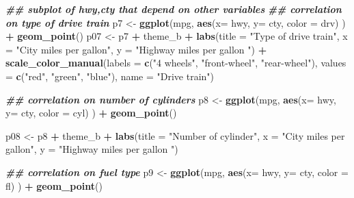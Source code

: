 \documentclass[
]{article}
\newenvironment{Shaded}{\begin{snugshade}}{\end{snugshade}}
\newcommand{\AttributeTok}[1]{\textcolor[rgb]{0.13,0.29,0.53}{#1}}
\newcommand{\DocumentationTok}[1]{\textcolor[rgb]{0.56,0.35,0.01}{\textbf{\textit{#1}}}}
\newcommand{\FunctionTok}[1]{\textcolor[rgb]{0.13,0.29,0.53}{\textbf{#1}}}
\newcommand{\NormalTok}[1]{#1}
\newcommand{\OtherTok}[1]{\textcolor[rgb]{0.56,0.35,0.01}{#1}}
\newcommand{\SpecialCharTok}[1]{\textcolor[rgb]{0.81,0.36,0.00}{\textbf{#1}}}
\newcommand{\StringTok}[1]{\textcolor[rgb]{0.31,0.60,0.02}{#1}}
\begin{document}
\begin{Shaded}
\begin{Highlighting}[]
\DocumentationTok{\#\# subplot of hwy,cty that depend on other variables}
\DocumentationTok{\#\# correlation on type of drive train}
\NormalTok{p7 }\OtherTok{\textless{}{-}} \FunctionTok{ggplot}\NormalTok{(mpg, }\FunctionTok{aes}\NormalTok{(}\AttributeTok{x=}\NormalTok{ hwy, }\AttributeTok{y=}\NormalTok{ cty, }\AttributeTok{color =}\NormalTok{ drv) ) }\SpecialCharTok{+}
  \FunctionTok{geom\_point}\NormalTok{()}
\NormalTok{p07 }\OtherTok{\textless{}{-}}
\NormalTok{p7 }\SpecialCharTok{+}\NormalTok{ theme\_b }\SpecialCharTok{+}
  \FunctionTok{labs}\NormalTok{(}\AttributeTok{title =} \StringTok{"Type of drive train"}\NormalTok{,}
       \AttributeTok{x =} \StringTok{"City miles per gallon"}\NormalTok{,}
       \AttributeTok{y =} \StringTok{"Highway miles per gallon "}\NormalTok{) }\SpecialCharTok{+}
  \FunctionTok{scale\_color\_manual}\NormalTok{(}\AttributeTok{labels =} \FunctionTok{c}\NormalTok{(}\StringTok{"4 wheels"}\NormalTok{, }\StringTok{"front{-}wheel"}\NormalTok{, }\StringTok{"rear{-}wheel"}\NormalTok{), }
                    \AttributeTok{values =} \FunctionTok{c}\NormalTok{(}\StringTok{"red"}\NormalTok{, }\StringTok{"green"}\NormalTok{, }\StringTok{"blue"}\NormalTok{),}
                    \AttributeTok{name =} \StringTok{"Drive train"}\NormalTok{)}

\DocumentationTok{\#\# correlation on number of cylinders}
\NormalTok{p8 }\OtherTok{\textless{}{-}} \FunctionTok{ggplot}\NormalTok{(mpg, }\FunctionTok{aes}\NormalTok{(}\AttributeTok{x=}\NormalTok{ hwy, }\AttributeTok{y=}\NormalTok{ cty, }\AttributeTok{color =}\NormalTok{ cyl) ) }\SpecialCharTok{+}
  \FunctionTok{geom\_point}\NormalTok{()}

\NormalTok{p08 }\OtherTok{\textless{}{-}}
\NormalTok{  p8 }\SpecialCharTok{+}\NormalTok{ theme\_b }\SpecialCharTok{+}
  \FunctionTok{labs}\NormalTok{(}\AttributeTok{title =} \StringTok{"Number of cylinder"}\NormalTok{,}
       \AttributeTok{x =} \StringTok{"City miles per gallon"}\NormalTok{,}
       \AttributeTok{y =} \StringTok{"Highway miles per gallon "}\NormalTok{)}

\DocumentationTok{\#\# correlation on fuel type}
\NormalTok{p9 }\OtherTok{\textless{}{-}} \FunctionTok{ggplot}\NormalTok{(mpg, }\FunctionTok{aes}\NormalTok{(}\AttributeTok{x=}\NormalTok{ hwy, }\AttributeTok{y=}\NormalTok{ cty, }\AttributeTok{color =}\NormalTok{ fl) ) }\SpecialCharTok{+}
  \FunctionTok{geom\_point}\NormalTok{()}


\end{Highlighting}
\end{Shaded}
\end{document}
